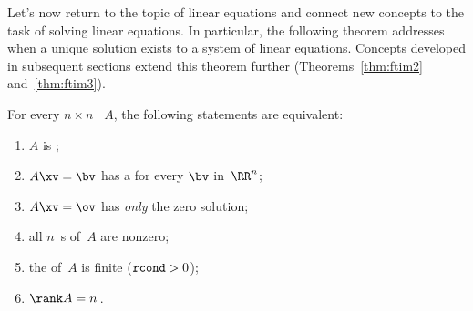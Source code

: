 





Let's now return to the topic of linear equations and connect new concepts to the task of solving linear equations.
In particular, the following theorem addresses when a unique solution exists to a system of linear equations.
Concepts developed in subsequent sections extend this theorem further (Theorems~\ref{thm:ftim2} and~\ref{thm:ftim3}).


\begin{theorem} \label{thm:ftim1} 
For every \(n\times n\) ~\(A\), the following statements are equivalent: 
\begin{enumerate}
\item\label{thm:ftim1i} \(A\) is ;
\item\label{thm:ftim1ii} \(A\xv=\bv\) has a  for every \(\bv\) in~\(\RR^n\);
\item\label{thm:ftim1iii} \(A\xv=\ov\) has \emph{only} the zero solution;
\item\label{thm:ftim1iv} all \(n\)~s of~\(A\) are nonzero;
\item\label{thm:ftim1ivx} the  of~\(A\) is finite (\(\verb|rcond|>0\));
\item\label{thm:ftim1v} \(\rank A=n\)\,.
\end{enumerate}
\end{theorem}

